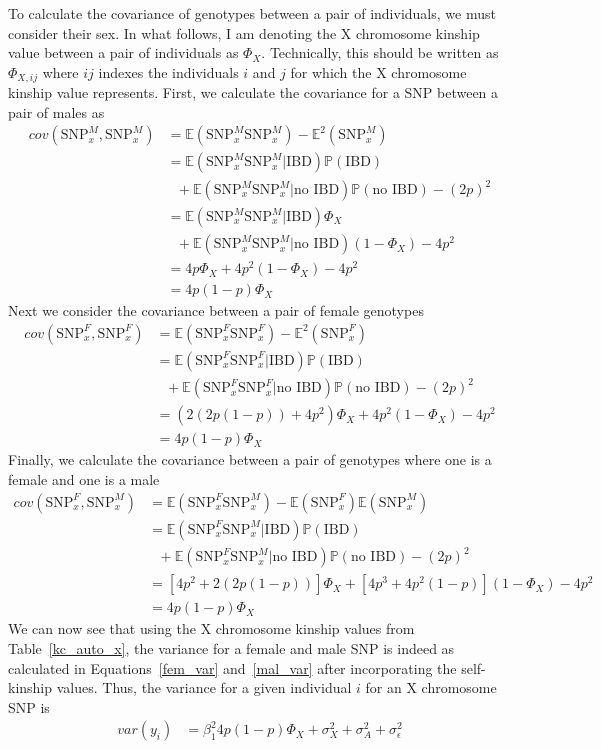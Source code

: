 \documentclass[11pt]{article} %
\newcommand{\snpXM}{\mbox{SNP}_x^M}
\newcommand{\snpXF}{\mbox{SNP}_x^F}
\begin{document}
To calculate the covariance of genotypes between a pair of individuals, we must consider their sex. In what follows, I am denoting the X chromosome kinship value between a pair of individuals as $\Phi_X$. Technically, this should be written as $\Phi_{X, ij}$ where $ij$ indexes the individuals $i$ and $j$ for which the X chromosome kinship value represents.
First, we calculate the covariance for a SNP between a pair of males as
\begin{align}
cov(\snpXM, \snpXM) &= \mathbb{E}(\snpXM \snpXM) - \mathbb{E}^2(\snpXM) \\
&=  \mathbb{E}(\snpXM \snpXM|\mbox{IBD})\mathbb{P}(\mbox{IBD}) \\
&\mbox{     }+\mathbb{E}(\snpXM \snpXM|\mbox{no IBD})\mathbb{P}(\mbox{no IBD})  -(2p)^2\\
&= \mathbb{E}(\snpXM \snpXM|\mbox{IBD})\Phi_X \\
&\mbox{     }  +\mathbb{E}(\snpXM \snpXM|\mbox{no IBD})(1-\Phi_X)-4p^2\\
&= 4p\Phi_X+4p^2(1-\Phi_X)-4p^2\\
&= 4p(1-p)\Phi_X
\end{align}
Next we consider the covariance between a pair of female genotypes
\begin{align}
cov(\snpXF,\snpXF) &= \mathbb{E}(\snpXF \snpXF) - \mathbb{E}^2(\snpXF) \\
&=  \mathbb{E}(\snpXF \snpXF|\mbox{IBD})\mathbb{P}(\mbox{IBD}) \\
&\mbox{     }+\mathbb{E}(\snpXF \snpXF|\mbox{no IBD})\mathbb{P}(\mbox{no IBD})  -(2p)^2\\
&= (2(2p(1-p))+4p^2)\Phi_X+4p^2(1-\Phi_X)-4p^2\\
&= 4p(1-p)\Phi_X
\end{align}
Finally, we calculate the covariance between a pair of genotypes where one is a female and one is a male
\begin{align}
cov(\snpXF,\snpXM) &= \mathbb{E}(\snpXF \snpXM) -\mathbb{E}(\snpXF)\mathbb{E}(\snpXM)\\
 &=  \mathbb{E}(\snpXF \snpXM|\mbox{IBD})\mathbb{P}(\mbox{IBD}) \\
&\mbox{     }+\mathbb{E}(\snpXF \snpXM|\mbox{no IBD})\mathbb{P}(\mbox{no IBD})  -(2p)^2\\
&= [4p^2+2(2p(1-p))]\Phi_X+[4p^3+4p^2(1-p)](1-\Phi_X)-4p^2\\
&= 4p(1-p)\Phi_X
\end{align} 
We can now see that using the X chromosome kinship values from Table~\ref{kc_auto_x}, the variance for a female and male SNP is indeed as calculated in Equations~\ref{fem_var} and~\ref{mal_var} after incorporating the self-kinship values. 
Thus, the variance for a given individual $i$ for an X chromosome SNP is 
\begin{align}
var(y_i)&=\beta_1^2 4p(1-p)\Phi_X+\sigma^2_X +\sigma^2_A + \sigma^2_\epsilon
\end{align}
\end{document}

